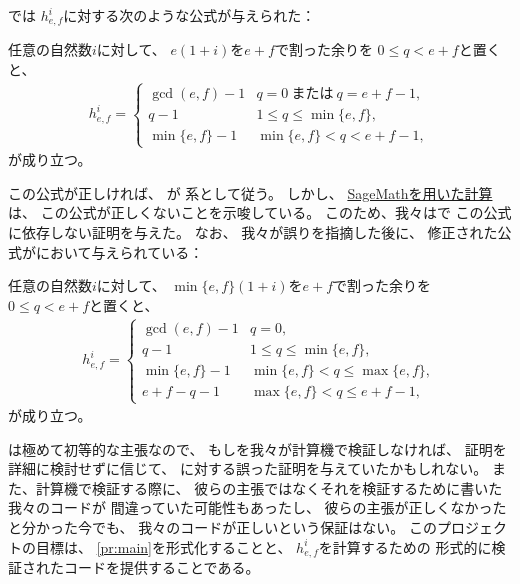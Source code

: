 \cite[Theorem C]{2404.17301v1}では
$h_{e,f}^i$に対する次のような公式が与えられた：

\begin{theorem}[{\cite[Theorem C]{2404.17301v2}}]
\label{th:APZ Theorem C v1}
任意の自然数$i$に対して、
$e (1+i)$を$e+f$で割った余りを
$0 \le q < e+f$と置くと、
\begin{align}
h_{e,f}^{i} =
\begin{cases}
\gcd(e,f)-1 & q = 0 \ \text{または}\ q=e+f-1, \\
q - 1 & 1 \le q \le \min \{e, f\}, \\
\min \{e, f\} - 1 & \min \{e, f\} < q < e+f-1, \end{cases}
\end{align}
が成り立つ。
\end{theorem}

この公式が正しければ、
が
系として従う。
しかし、
\href{https://github.com/uedakazushi/cluster_sfuk_lean/blob/master/dim_SH.ipynb}{SageMathを用いた計算}
は、
この公式が正しくないことを示唆している。
このため、我々は\cite{2406.15915}で
この公式に依存しない証明を与えた。
なお、
我々が誤りを指摘した後に、
修正された公式が\cite[Theorem C]{2404.17301v2}において与えられている：

\begin{theorem}[{\cite[Theorem C]{2404.17301v2}}]
\label{th:APZ Theorem C v2}
任意の自然数$i$に対して、
$\min \{ e, f \} (1+i)$を$e+f$で割った余りを
$0 \le q < e+f$と置くと、
\begin{align}
h_{e,f}^{i} =
\begin{cases}
\gcd(e,f)-1 & q = 0, \\
q - 1 & 1 \le q \le \min \{e, f\}, \\
\min \{e, f\} - 1 & \min \{e, f\} < q \le \max \{e, f\}, \\
e + f - q - 1 & \max \{e, f\} < q \le e + f - 1,
\end{cases}
\end{align}
が成り立つ。
\end{theorem}

は極めて初等的な主張なので、
もしを我々が計算機で検証しなければ、
証明を詳細に検討せずに信じて、
に対する誤った証明を与えていたかもしれない。
また、計算機で検証する際に、
彼らの主張ではなくそれを検証するために書いた我々のコードが
間違っていた可能性もあったし、
彼らの主張が正しくなかったと分かった今でも、
我々のコードが正しいという保証はない。
このプロジェクトの目標は、
\cref{pr:main}を形式化することと、
$h_{e,f}^i$を計算するための
形式的に検証されたコードを提供することである。

